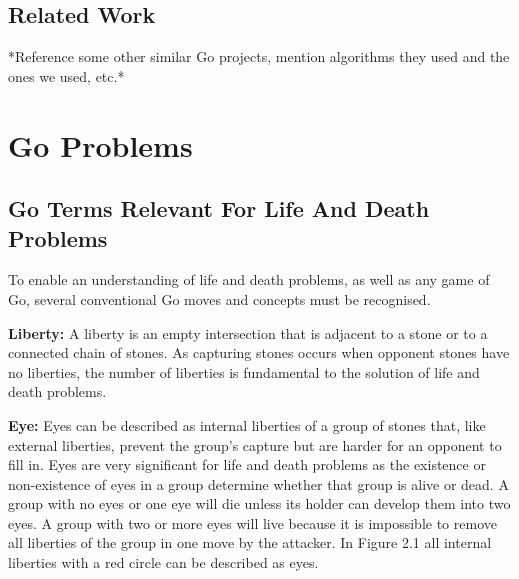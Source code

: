\documentclass{l3proj}
\begin{document}
\subsection{Related Work}

*Reference some other similar Go projects, mention algorithms they used and the ones we used, etc.*

\section{Go Problems}

\subsection{Go Terms Relevant For Life And Death Problems}

To enable an understanding of life and death problems, as well as any game of Go, several conventional Go moves and concepts must be recognised.

\textbf{Liberty:} A liberty is an empty intersection that is adjacent to a stone or to a connected chain of stones. As capturing stones occurs when opponent stones have no liberties, the number of liberties is fundamental to the solution of life and death problems.  

\textbf{Eye:} Eyes can be described as internal liberties of a group of stones that, like external liberties, prevent the group's capture but are harder for an opponent to fill in. Eyes are very significant for life and death problems as the existence or non-existence of eyes in a group determine whether that group is alive or dead. A group with no eyes or one eye will die unless its holder can develop them into two eyes. A group with two or more eyes will live because it is impossible to remove all liberties of the group in one move by the attacker. In Figure 2.1 all internal liberties with a red circle can be described as eyes.
\end{document}
